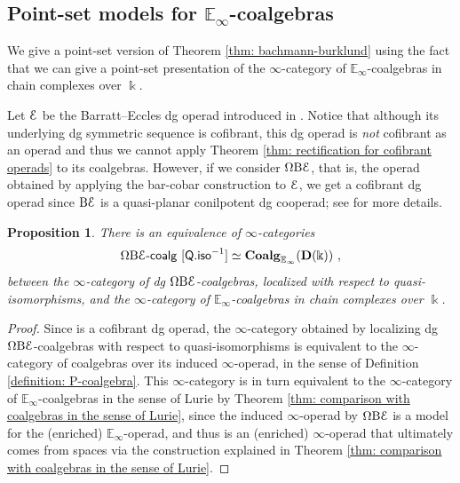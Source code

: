 \documentclass[a4paper,12pt]{amsart}
\renewcommand{\mathcal}{\EuScript}
\theoremstyle{plain}
\newtheorem{proposition}[theorem]{Proposition}%
\theoremstyle{definition}
\theoremstyle{remark}
\newcommand{\kk}{\Bbbk}
\begin{document}
\subsection{Point-set models for $\mathbb{E}_\infty$-coalgebras}
We give a point-set version of Theorem \ref{thm: bachmann-burklund} using the fact that we can give a point-set presentation of the $\infty$-category of $\mathbb{E}_\infty$-coalgebras in chain complexes over $\kk$. 


Let $\mathcal{E}$ be the Barratt--Eccles dg operad introduced in \cite{BergerFresse}. Notice that although its underlying dg symmetric sequence is cofibrant, this dg operad is \textit{not} cofibrant as an operad and thus we cannot apply Theorem \ref{thm: rectification for cofibrant operads} to its coalgebras. However, if we consider $\Omega\mathrm{B}\mathcal{E}$, that is, the operad obtained by applying the bar-cobar construction to $\mathcal{E}$, we get a cofibrant dg operad since $\mathrm{B}\mathcal{E}$ is a quasi-planar conilpotent dg cooperad; see \cite[Section 2]{premierpapier} for more details. 

\begin{proposition}
There is an equivalence of $\infty$-categories
\[
\Omega \mathrm{B} \mathcal{E}\text{-}\mathsf{coalg}~[\mathsf{Q.iso}^{-1}] \simeq \mathbf{Coalg}_{\mathbb{E}_\infty}(\mathbf{D}(\kk))~, 
\]
between the $\infty$-category of dg $\Omega\mathrm{B}\mathcal{E}$-coalgebras, localized with respect to quasi-isomorphisms, and the $\infty$-category of $\mathbb{E}_\infty$-coalgebras in chain complexes over $\kk$. 
\end{proposition}

\begin{proof}
Since is a cofibrant dg operad, the $\infty$-category obtained by localizing dg $\Omega \mathrm{B} \mathcal{E}$-coalgebras with respect to quasi-isomorphisms is equivalent to the $\infty$-category of coalgebras over its induced $\infty$-operad, in the sense of Definition \ref{definition: P-coalgebra}. This $\infty$-category is in turn equivalent to the $\infty$-category of $\mathbb{E}_\infty$-coalgebras in the sense of Lurie by Theorem \ref{thm: comparison with coalgebras in the sense of Lurie}, since the induced $\infty$-operad by $\Omega \mathrm{B} \mathcal{E}$ is a model for the (enriched) $\mathbb{E}_\infty$-operad, and thus is an (enriched) $\infty$-operad that ultimately comes from spaces via the construction explained in Theorem \ref{thm: comparison with coalgebras in the sense of Lurie}. 
\end{proof}
\end{document}
